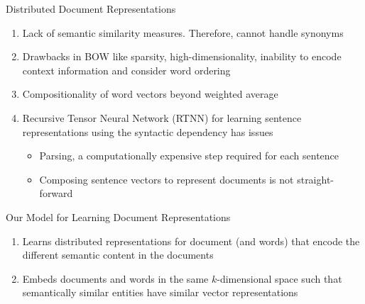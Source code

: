 \documentclass[10pt]{beamer}
\begin{document}
\begin{frame}{Distributed Document Representations}
\vfill {}
\begin{enumerate}
	\vfill\item<1-> Lack of semantic similarity measures. Therefore, cannot handle synonyms
	\vfill\item<1-> Drawbacks in BOW like sparsity, high-dimensionality, inability to encode context information and consider word ordering
	\vfill\item<1-> Compositionality of word vectors beyond weighted average \cite{mitchell2010composition, zanzotto2010estimating, yessenalina2011compositional, grefenstette2013multi, mikolov2013distributed} 
	\vfill\item<1-> Recursive Tensor Neural Network (RTNN) \cite{socher2013recursive} for learning sentence representations using the syntactic dependency has issues
	\begin{itemize}
		\vfill\item<1-> Parsing, a computationally expensive step required for each sentence
		\vfill\item<1-> Composing sentence vectors to represent documents is not straight-forward
	\end{itemize}
\end{enumerate}
\end{frame}



\begin{frame}{Our Model for Learning Document Representations}
\vfill {}
\vfill {}

\vfill {}
\begin{enumerate}
	\vfill\item<1-> Learns distributed representations for document (and words) that encode the different semantic content in the documents
	\vfill\item<1-> Embeds documents and words in the same $k$-dimensional space such that semantically similar entities have similar vector representations
\end{enumerate}

\end{frame}
\end{document}
